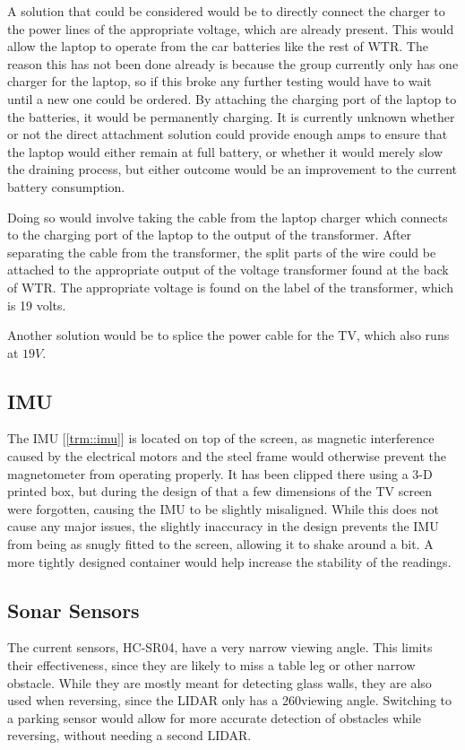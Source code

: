 A solution that could be considered would be to directly connect the charger to the power lines of the appropriate voltage, which are already present.
This would allow the laptop to operate from the car batteries like the rest of WTR.
The reason this has not been done already is because the group currently only has one charger for the laptop, so if this broke any further testing would have to wait until a new one could be ordered.
By attaching the charging port of the laptop to the batteries, it would be permanently charging.
It is currently unknown whether or not the direct attachment solution could provide enough amps to ensure that the laptop would either remain at full battery, or whether it would merely slow the draining process, but either outcome would be an improvement to the current battery consumption.

Doing so would involve taking the cable from the laptop charger which connects to the charging port of the laptop to the output of the transformer.
After separating the cable from the transformer, the split parts of the wire could be attached to the appropriate output of the voltage transformer found at the back of WTR.
The appropriate voltage is found on the label of the transformer, which is 19 volts.

Another solution would be to splice the power cable for the TV, which also runs at $19V$.


\subsection{IMU}
The IMU [\ref{trm::imu}] is located on top of the screen, as magnetic interference caused by the electrical motors and the steel frame would otherwise prevent the magnetometer from operating properly.
It has been clipped there using a 3-D printed box, but during the design of that a few dimensions of the TV screen were forgotten, causing the IMU to be slightly misaligned.
While this does not cause any major issues, the slightly inaccuracy in the design prevents the IMU from being as snugly fitted to the screen, allowing it to shake around a bit.
A more tightly designed container would help increase the stability of the readings.


\subsection{Sonar Sensors}
The current sensors, HC-SR04, have a very narrow viewing angle.
This limits their effectiveness, since they are likely to miss a table leg or other narrow obstacle.
While they are mostly meant for detecting glass walls, they are also used when reversing, since the LIDAR only has a 260\textdegree viewing angle.
Switching to a parking sensor would allow for more accurate detection of obstacles while reversing, without needing a second LIDAR.

\newpage
